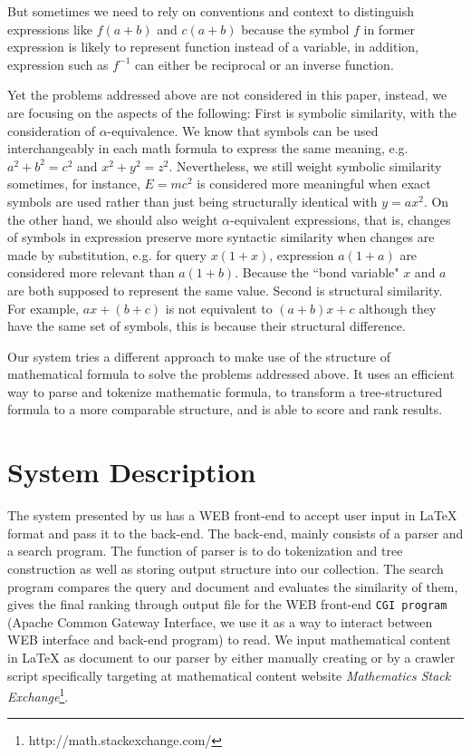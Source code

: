 \documentclass{acm_proc_article-sp}
\begin{document}
But sometimes we need to rely on conventions and context to distinguish expressions like $f(a+b)$ and $c(a+b)$ because the symbol $f$ in former expression is likely to represent function instead of a variable, 
in addition, expression such as $f^{-1}$ can either be reciprocal or an inverse function.

Yet the problems addressed above are not considered in this paper, instead, we are focusing on the aspects of the following: 
First is symbolic similarity, with the consideration of $\alpha$-equivalence. We know that symbols can be used interchangeably in each math formula to express the same meaning, e.g. $a^2+b^2=c^2$ and $x^2+y^2=z^2$. Nevertheless, we still weight symbolic similarity sometimes, for instance, $E=mc^2$ is considered more meaningful when exact symbols are used rather than just being structurally identical with $y=ax^2$.
On the other hand, we should also weight $\alpha$-equivalent expressions, that is, changes of symbols in expression preserve more syntactic similarity when changes are made by substitution, e.g. for query $x(1+x)$, expression $a(1+a)$ are considered more relevant than $a(1+b)$. Because the ``bond variable" $x$ and $a$ are both supposed to represent the same value.
Second is structural similarity. For example, $ax+(b+c)$ is not equivalent to $(a+b)x+c$ although they have the same set of symbols, this is because their structural difference.



Our system tries a different approach to make use of the structure of mathematical formula to solve the problems addressed above. It uses an efficient way to parse and tokenize mathematic formula, to transform a tree-structured formula to a more comparable structure, and is able to score and rank results.

\section{System Description}
The system presented by us has a WEB front-end to accept user input in \LaTeX{} format and pass it to the back-end. The back-end, mainly consists of a parser and a search program. The function of parser is to do tokenization and tree construction as well as storing output structure into our collection. The search program compares the query and document and evaluates the similarity of them, gives the final ranking through output file for the WEB front-end \texttt{CGI program} (Apache Common Gateway Interface, we use it as a way to interact between WEB interface and back-end program) to read. We input mathematical content in \LaTeX{} as document to our parser by either manually creating or by a crawler script specifically targeting at mathematical content website \textit{Mathematics Stack Exchange}\footnote{http://math.stackexchange.com/}.
\end{document}
